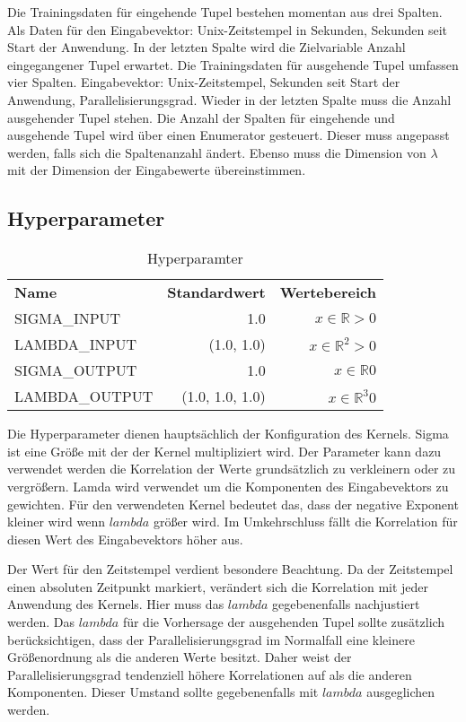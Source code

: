 Die Trainingsdaten für eingehende Tupel bestehen momentan aus drei Spalten.
Als Daten für den Eingabevektor: Unix-Zeitstempel in Sekunden, Sekunden seit Start der Anwendung.
In der letzten Spalte wird die Zielvariable Anzahl eingegangener Tupel erwartet.
Die Trainingsdaten für ausgehende Tupel umfassen vier Spalten.
Eingabevektor: Unix-Zeitstempel, Sekunden seit Start der Anwendung, Parallelisierungsgrad.
Wieder in der letzten Spalte muss die Anzahl ausgehender Tupel stehen.
Die Anzahl der Spalten für eingehende und ausgehende Tupel wird über einen Enumerator gesteuert.
Dieser muss angepasst werden, falls sich die Spaltenanzahl ändert.
Ebenso muss die Dimension von \(\lambda\) mit der Dimension der Eingabewerte übereinstimmen.

\subsection{Hyperparameter}

\begin{table}[!htbp]
\centering
\caption{Hyperparamter}
\begin{tabular}{l|r|r}
\hline
\textbf{Name} & \textbf{Standardwert} & \textbf{Wertebereich} \\
SIGMA\_INPUT & 1.0 & \(x \in \mathbb{R} > 0 \) \\
LAMBDA\_INPUT & (1.0, 1.0) &  \(x \in \mathbb{R}^2 > 0 \) \\
SIGMA\_OUTPUT & 1.0 & \(x \in \mathbb{R} 0 \) \\
LAMBDA\_OUTPUT & (1.0, 1.0, 1.0) & \(x \in \mathbb{R}^3 0\) \\
\hline
\end{tabular}
\end{table}

Die Hyperparameter dienen hauptsächlich der Konfiguration des Kernels.
Sigma ist eine Größe mit der der Kernel multipliziert wird.
Der Parameter kann dazu verwendet werden die Korrelation der Werte grundsätzlich zu verkleinern oder zu vergrößern.
Lamda wird verwendet um die Komponenten des Eingabevektors zu gewichten.
Für den verwendeten Kernel bedeutet das, dass der negative Exponent kleiner wird wenn \(lambda\) größer wird.
Im Umkehrschluss fällt die Korrelation für diesen Wert des Eingabevektors höher aus.

Der Wert für den Zeitstempel verdient besondere Beachtung.
Da der Zeitstempel einen absoluten Zeitpunkt markiert, verändert sich die Korrelation mit jeder Anwendung des Kernels.
Hier muss das \(lambda\) gegebenenfalls nachjustiert werden.
Das \(lambda\) für die Vorhersage der ausgehenden Tupel sollte zusätzlich berücksichtigen, dass der Parallelisierungsgrad im Normalfall eine kleinere Größenordnung als die anderen Werte besitzt.
Daher weist der Parallelisierungsgrad tendenziell höhere Korrelationen auf als die anderen Komponenten.
Dieser Umstand sollte gegebenenfalls mit \(lambda\) ausgeglichen werden.

